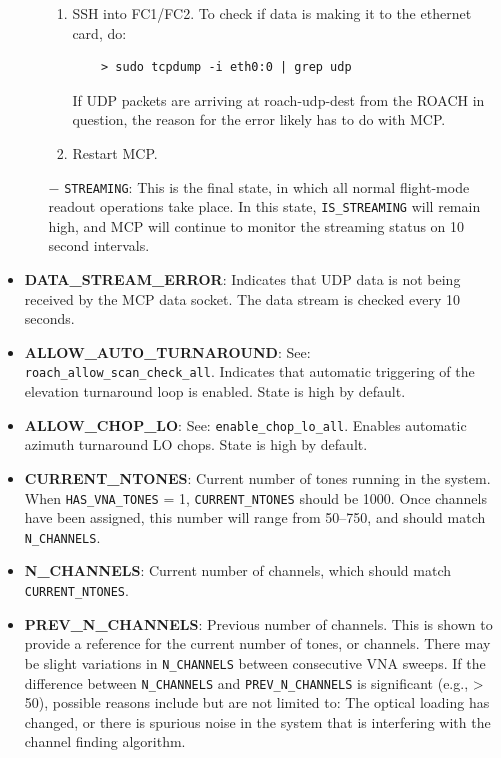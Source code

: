 \begin{itemize}[leftmargin=*,label={}]
\begin{itemize}
\begin{enumerate}
  \item SSH into FC1/FC2. To check if data is making it to the ethernet card, do:
  \begin{verbatim}
    > sudo tcpdump -i eth0:0 | grep udp
  \end{verbatim}

If UDP packets are arriving at roach-udp-dest from the ROACH in question, the reason for the error likely has to do with MCP.
\item Restart MCP.

\end{enumerate}

\item[$-$] \texttt{STREAMING}: This is the final state, in which all normal flight-mode readout operations take place. In this state, \texttt{IS\_STREAMING} will remain high, and MCP will continue to monitor the streaming status on 10 second intervals.

\end{itemize}

\item \textbf{DATA\_STREAM\_ERROR}: Indicates that UDP data is not being received by the MCP data socket. The data stream is checked every 10 seconds.

\item \textbf{ALLOW\_AUTO\_TURNAROUND}: See: \texttt{roach\_allow\_scan\_check\_all}. Indicates that automatic triggering of the elevation turnaround loop is enabled. State is high by default.

\item \textbf{ALLOW\_CHOP\_LO}: See: \texttt{enable\_chop\_lo\_all}. Enables automatic azimuth turnaround LO chops. State is high by default.

\item \textbf{CURRENT\_NTONES}: Current number of tones running in the system. When \texttt{HAS\_VNA\_TONES} = 1, \texttt{CURRENT\_NTONES} should be 1000. Once channels have been assigned, this number will range from 50--750, and should match \texttt{N\_CHANNELS}.

\item \textbf{N\_CHANNELS}: Current number of channels, which should match \texttt{CURRENT\_NTONES}.

\item \textbf{PREV\_N\_CHANNELS}: Previous number of channels. This is shown to provide a reference for the current number of tones, or channels. There may be slight variations in \texttt{N\_CHANNELS} between consecutive VNA sweeps. If the difference between \texttt{N\_CHANNELS} and \texttt{PREV\_N\_CHANNELS} is significant (e.g., > 50), possible reasons include but are not limited to: The optical loading has changed, or there is spurious noise in the system that is interfering with the channel finding algorithm.


\end{itemize}
